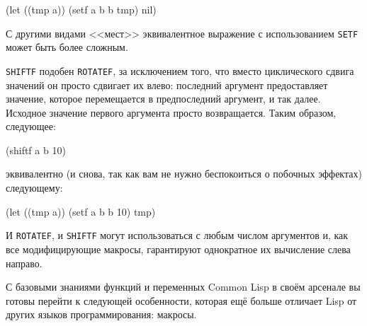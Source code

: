\begin{myverb}
  (let ((tmp a)) (setf a b b tmp) nil)
\end{myverb}

С другими видами <<мест>> эквивалентное выражение с использованием \lstinline{SETF} может быть
более сложным.

\lstinline{SHIFTF} подобен \lstinline{ROTATEF}, за исключением того, что вместо циклического
сдвига значений он просто сдвигает их влево: последний аргумент предоставляет значение,
которое перемещается в предпоследний аргумент, и так далее. Исходное значение первого
аргумента просто возвращается. Таким образом, следующее:

\begin{myverb}
  (shiftf a b 10)
\end{myverb}

\noindent{}эквивалентно (и снова, так как вам не нужно беспокоиться о побочных эффектах) следующему:

\begin{myverb}
  (let ((tmp a)) (setf a b b 10) tmp)
\end{myverb}

И \lstinline{ROTATEF}, и \lstinline{SHIFTF} могут использоваться с любым числом аргументов и,
как все модифицирующие макросы, гарантируют однократное их вычисление слева направо.

С базовыми знаниями функций и переменных Common Lisp в своём арсенале вы готовы перейти к
следующей особенности, которая ещё больше отличает Lisp от других языков программирования:
макросы.

